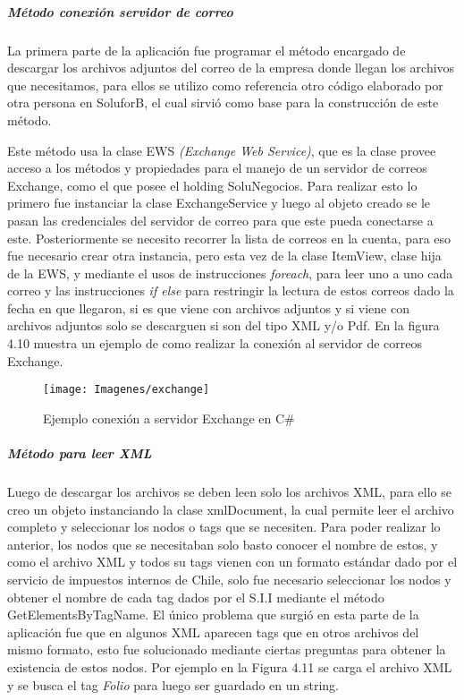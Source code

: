 			\subparagraph{Método conexión servidor de correo}
			La primera parte de la aplicación fue programar el método encargado de descargar los archivos adjuntos del correo de la empresa donde llegan los archivos que necesitamos, para ellos se utilizo como referencia otro código elaborado por otra persona en SoluforB, el cual sirvió como base para la construcción de este método.
			\newline
			\par
			Este método usa la clase EWS \textit{(Exchange Web Service)}, que es la clase provee acceso a los métodos y propiedades para el manejo de un servidor de correos Exchange, como el que posee el holding SoluNegocios. Para realizar esto lo primero fue instanciar la clase ExchangeService y luego al objeto creado se le pasan las credenciales del servidor de correo para que este pueda conectarse a este. Posteriormente se necesito recorrer la lista de correos en la cuenta, para eso fue necesario crear otra instancia, pero esta vez de la clase ItemView, clase hija de la EWS, y mediante el usos de instrucciones \textit{foreach}, para leer uno a uno cada correo y  las instrucciones \textit{if else} para restringir la lectura de estos correos dado la fecha en que llegaron, si es que viene con archivos adjuntos y si viene con archivos adjuntos solo se descarguen si son del tipo XML y/o Pdf. En la figura 4.10 muestra un ejemplo de como realizar la conexión al servidor de correos Exchange.

			\begin{figure}[H]
				\centering
				\texttt{[image: Imagenes/exchange]}
				\caption{Ejemplo conexión a servidor Exchange en C$\#$}
			\end{figure}
			
			\par 
			\subparagraph{Método para leer XML}
			Luego de descargar los archivos se deben leen solo los archivos XML, para ello se creo un objeto instanciando la clase xmlDocument, la cual permite leer el archivo completo y seleccionar los nodos o tags que se necesiten. Para poder realizar lo anterior, los nodos que se necesitaban solo basto conocer el nombre de estos, y como el archivo XML y todos su tags vienen con un formato estándar dado por el servicio de impuestos internos de Chile, solo fue necesario seleccionar los nodos y obtener el nombre de cada tag dados por el S.I.I mediante el método GetElementsByTagName. El único problema que surgió en esta parte de la aplicación fue que en algunos XML aparecen tags que en otros archivos del mismo formato, esto fue solucionado mediante ciertas preguntas para obtener la existencia de estos nodos. Por ejemplo en la Figura 4.11 se carga el archivo XML y se busca el tag \textit{Folio} para luego ser guardado en un string.\\

